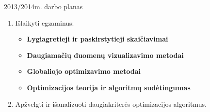 \documentclass{beamer}
\begin{document}
\begin{frame}[fragile]{2013/2014m. darbo planas}
    \begin{enumerate}
    \item Išlaikyti egzaminus: 
    \begin{itemize}
        \item \textbf{Lygiagretieji ir paskirstytieji skaičiavimai}
        \item \textbf{Daugiamačių duomenų vizualizavimo metodai}
        \item \textbf{Globaliojo optimizavimo metodai}
        \item \textbf{Optimizacijos teorija ir algoritmų sudėtingumas}
    \end{itemize}

    \bigskip
    \item  Apžvelgti ir išanalizuoti daugiakriterės optimizacijos algoritmus.
\end{enumerate}
\end{frame}
\end{document}
